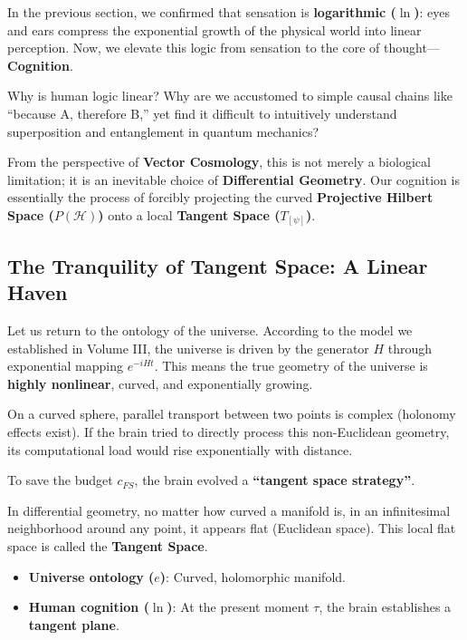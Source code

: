 \documentclass[11pt,a4paper,twoside]{book}
\begin{document}
In the previous section, we confirmed that sensation is \textbf{logarithmic ($\ln$)}: eyes and ears compress the exponential growth of the physical world into linear perception. Now, we elevate this logic from sensation to the core of thought---\textbf{Cognition}.

Why is human logic linear? Why are we accustomed to simple causal chains like ``because A, therefore B,'' yet find it difficult to intuitively understand superposition and entanglement in quantum mechanics?

From the perspective of \textbf{Vector Cosmology}, this is not merely a biological limitation; it is an inevitable choice of \textbf{Differential Geometry}. Our cognition is essentially the process of forcibly projecting the curved \textbf{Projective Hilbert Space ($P(\mathcal{H})$)} onto a local \textbf{Tangent Space ($T_{[\psi]}$)}.

\subsection{The Tranquility of Tangent Space: A Linear Haven}

Let us return to the ontology of the universe. According to the model we established in Volume III, the universe is driven by the generator $H$ through exponential mapping $e^{-iHt}$. This means the true geometry of the universe is \textbf{highly nonlinear}, curved, and exponentially growing.

On a curved sphere, parallel transport between two points is complex (holonomy effects exist). If the brain tried to directly process this non-Euclidean geometry, its computational load would rise exponentially with distance.

To save the budget $c_{FS}$, the brain evolved a \textbf{``tangent space strategy''}.

In differential geometry, no matter how curved a manifold is, in an infinitesimal neighborhood around any point, it appears flat (Euclidean space). This local flat space is called the \textbf{Tangent Space}.

\begin{itemize}
\item \textbf{Universe ontology ($e$)}: Curved, holomorphic manifold.

\item \textbf{Human cognition ($\ln$)}: At the present moment $\tau$, the brain establishes a \textbf{tangent plane}.
\end{itemize}
\end{document}
